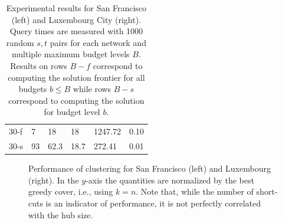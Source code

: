\begin{table}
{\begin{tabular}{ | l | p{1cm} | p{1cm} | p{1cm} | p{1.2cm} | p{1.2cm} |}
30-f & 7  & 18   & 18   & 1247.72 & 0.10 \\
30-s & 93 & 62.3 & 18.7 & 272.41  & 0.01 \\ \hline
\end{tabular}%
}
\vspace{13pt}
\caption{Experimental results for San Francisco (left) and Luxembourg City (right). Query times are measured with 1000 random $s,t$ pairs for each network and multiple maximum budget levels $B$. Results on rows $B-f$ correspond to computing the solution frontier for all budgets $b\leq B$ while rows $B-s$ correspond to computing the solution for budget level $b$.}
\label{tab:performance_results}
\end{table}



\begin{figure}
\begin{minipage}{0.25\textwidth}
\centering

\end{minipage}%
\begin{minipage}{0.25\textwidth}
\centering

\end{minipage}
\caption{Performance of clustering for San Francisco (left) and Luxembourg (right). 
In the $y$-axis the quantities are normalized by the best greedy cover, i.e., using $k=n$.
Note that, while the number of short-cuts is an indicator of performance, it is not perfectly correlated with the hub size.}
\label{fig:clusters}
\end{figure}

